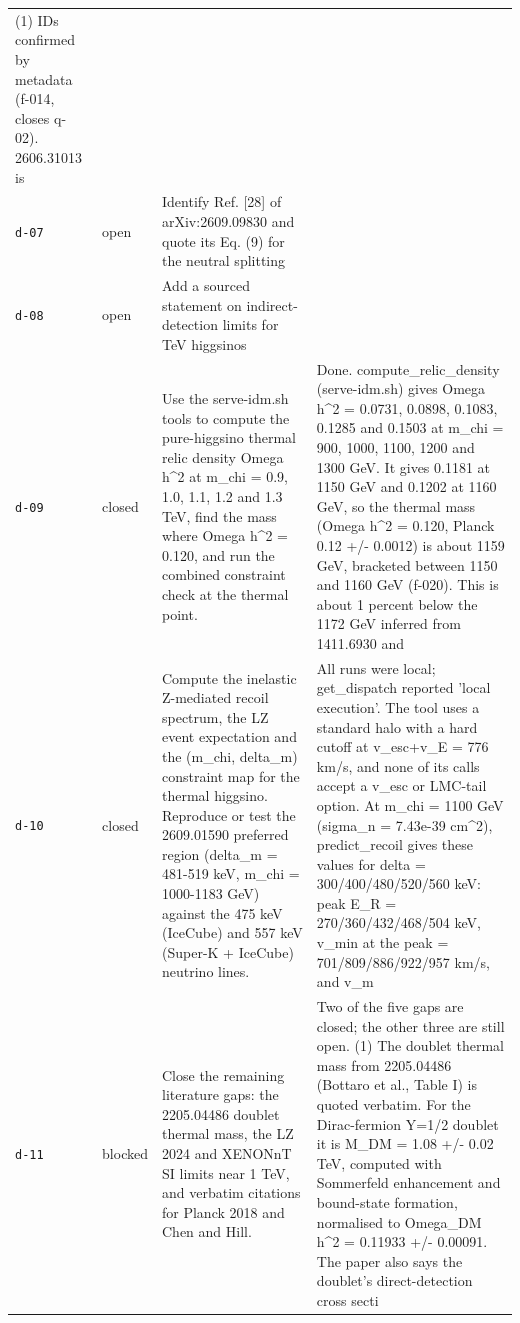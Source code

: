\documentclass[11pt,a4paper]{article}
\begin{document}
\begin{longtable}{@{}p{}p{}p{}p{}@{}}
(1) IDs confirmed by metadata (f-014, closes q-02). 2606.31013 is \\
\texttt{d-07} & open & Identify Ref. [28] of arXiv:2609.09830 and quote its Eq. (9) for the neutral splitting &  \\
\texttt{d-08} & open & Add a sourced statement on indirect-detection limits for TeV higgsinos &  \\
\texttt{d-09} & closed & Use the serve-idm.sh tools to compute the pure-higgsino thermal relic density Omega h\textasciicircum{}2 at m\_chi = 0.9, 1.0, 1.1, 1.2 and 1.3 TeV, find the mass where Omega h\textasciicircum{}2 = 0.120, and run the combined constraint check at the thermal point. & Done. compute\_relic\_density (serve-idm.sh) gives Omega h\textasciicircum{}2 = 0.0731, 0.0898, 0.1083, 0.1285 and 0.1503 at m\_chi = 900, 1000, 1100, 1200 and 1300 GeV. It gives 0.1181 at 1150 GeV and 0.1202 at 1160 GeV, so the thermal mass (Omega h\textasciicircum{}2 = 0.120, Planck 0.12 +/- 0.0012) is about 1159 GeV, bracketed between 1150 and 1160 GeV (f-020). This is about 1 percent below the 1172 GeV inferred from 1411.6930 and \\
\texttt{d-10} & closed & Compute the inelastic Z-mediated recoil spectrum, the LZ event expectation and the (m\_chi, delta\_m) constraint map for the thermal higgsino. Reproduce or test the 2609.01590 preferred region (delta\_m = 481-519 keV, m\_chi = 1000-1183 GeV) against the 475 keV (IceCube) and 557 keV (Super-K + IceCube) neutrino lines. & All runs were local; get\_dispatch reported 'local execution'. The tool uses a standard halo with a hard cutoff at v\_esc+v\_E = 776 km/s, and none of its calls accept a v\_esc or LMC-tail option. At m\_chi = 1100 GeV (sigma\_n = 7.43e-39 cm\textasciicircum{}2), predict\_recoil gives these values for delta = 300/400/480/520/560 keV: peak E\_R = 270/360/432/468/504 keV, v\_min at the peak = 701/809/886/922/957 km/s, and v\_m \\
\texttt{d-11} & blocked & Close the remaining literature gaps: the 2205.04486 doublet thermal mass, the LZ 2024 and XENONnT SI limits near 1 TeV, and verbatim citations for Planck 2018 and Chen and Hill. & Two of the five gaps are closed; the other three are still open. (1) The doublet thermal mass from 2205.04486 (Bottaro et al., Table I) is quoted verbatim. For the Dirac-fermion Y=1/2 doublet it is M\_DM = 1.08 +/- 0.02 TeV, computed with Sommerfeld enhancement and bound-state formation, normalised to Omega\_DM h\textasciicircum{}2 = 0.11933 +/- 0.00091. The paper also says the doublet's direct-detection cross secti \\

\end{longtable}
\end{document}
